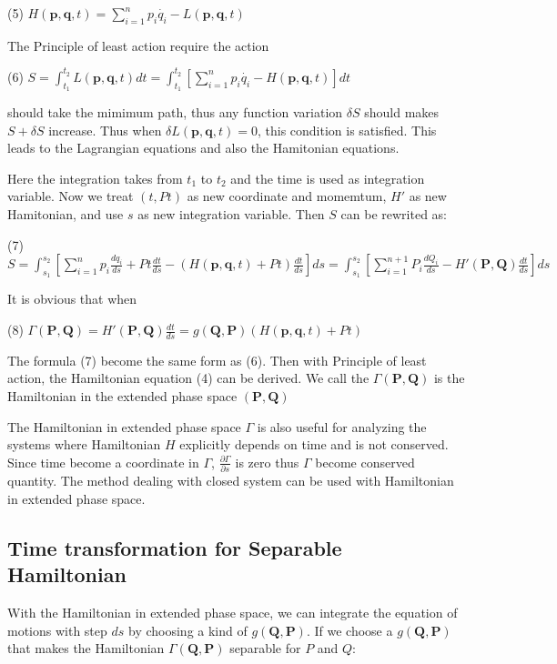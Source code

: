 (5) $ H(\mathbf{p},\mathbf{q},t) = \sum_{i=1}^n p_i \dot{q_i} - L(\mathbf{p},\mathbf{q},t) $

The Principle of least action require the action

(6) $ S = \int_{t_1}^{t_2} L(\mathbf{p},\mathbf{q},t) dt = \int_{t_1}^{t_2} \left[ \sum_{i=1}^n p_i \dot{q_i} - H(\mathbf{p},\mathbf{q},t) \right] dt $

should take the mimimum path, thus any function variation $ \delta S $ should makes $ S + \delta S$ increase. Thus when $ \delta L(\mathbf{p},\mathbf{q},t) = 0 $, this condition is satisfied. This leads to the Lagrangian equations and also the Hamitonian equations.

Here the integration takes from $ t_1 $ to $ t_2 $ and the time is used as integration variable. Now we treat $(t, Pt)$ as new coordinate and momemtum, $H'$ as new Hamitonian, and use $s$ as new integration variable. Then $S$ can be rewrited as\+:

(7) $ S = \int_{s_1}^{s_2} \left[ \sum_{i=1}^n p_i \frac{d q_i} {d s} + Pt \frac{d t}{d s} - (H(\mathbf{p},\mathbf{q},t) + Pt) \frac{d t}{d s} \right] ds = \int_{s_1}^{s_2} \left[ \sum_{i=1}^{n+1} P_i \frac{d Q_i}{d s} - H'(\mathbf{P},\mathbf{Q}) \frac{d t}{d s}\right] ds $

It is obvious that when

(8) $ \Gamma(\mathbf{P},\mathbf{Q}) = H'(\mathbf{P},\mathbf{Q}) \frac{d t}{d s} = g(\mathbf{Q},\mathbf{P}) (H(\mathbf{p},\mathbf{q},t) + Pt) $

The formula (7) become the same form as (6). Then with Principle of least action, the Hamiltonian equation (4) can be derived. We call the $ \Gamma(\mathbf{P},\mathbf{Q}) $ is the Hamiltonian in the extended phase space $ (\mathbf{P},\mathbf{Q}) $

The Hamiltonian in extended phase space $\Gamma$ is also useful for analyzing the systems where Hamiltonian $H$ explicitly depends on time and is not conserved. Since time become a coordinate in $\Gamma$, $\frac{\partial \Gamma}{\partial s}$ is zero thus $ \Gamma$ become conserved quantity. The method dealing with closed system can be used with Hamiltonian in extended phase space.\hypertarget{index_T_sec}{}\subsection{Time transformation for Separable Hamiltonian}\label{index_T_sec}
With the Hamiltonian in extended phase space, we can integrate the equation of motions with step $ ds $ by choosing a kind of $g(\mathbf{Q},\mathbf{P})$. If we choose a $g(\mathbf{Q},\mathbf{P})$ that makes the Hamiltonian $\Gamma(\mathbf{Q},\mathbf{P})$ separable for $P$ and $Q$\+:

